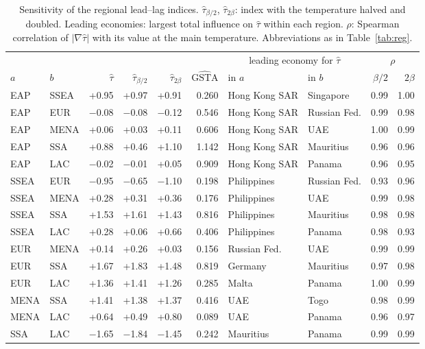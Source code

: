 \documentclass[12pt]{article}
\theoremstyle{definition}
\begin{document}
\begin{table}[hp]
\caption{Sensitivity of the regional lead--lag indices. $\hat\tau_{\beta/2}$, $\hat\tau_{2\beta}$: index with the temperature halved and doubled. Leading economies: largest total influence on $\hat\tau$ within each region. $\rho$: Spearman correlation of $|\nabla\hat\tau|$ with its value at the main temperature. Abbreviations as in Table~\ref{tab:reg}.}\label{tab:regsens}
\centering\scriptsize
\begin{tabular}{llrrrrllrr}
\toprule
 & & & & & & \multicolumn{2}{c}{leading economy for $\hat\tau$} & \multicolumn{2}{c}{$\rho$}\\
\cmidrule(lr){7-8}\cmidrule(lr){9-10}
$a$ & $b$ & $\hat\tau$ & $\hat\tau_{\beta/2}$ & $\hat\tau_{2\beta}$ & $\widehat{\mathrm{GSTA}}$ & in $a$ & in $b$ & $\beta/2$ & $2\beta$\\
\midrule
EAP & SSEA & +0.95 & +0.97 & +0.91 & 0.260 & Hong Kong SAR & Singapore & 0.99 & 1.00\\
EAP & EUR & $-$0.08 & $-$0.08 & $-$0.12 & 0.546 & Hong Kong SAR & Russian Fed. & 0.99 & 0.98\\
EAP & MENA & +0.06 & +0.03 & +0.11 & 0.606 & Hong Kong SAR & UAE & 1.00 & 0.99\\
EAP & SSA & +0.88 & +0.46 & +1.10 & 1.142 & Hong Kong SAR & Mauritius & 0.96 & 0.96\\
EAP & LAC & $-$0.02 & $-$0.01 & +0.05 & 0.909 & Hong Kong SAR & Panama & 0.96 & 0.95\\
SSEA & EUR & $-$0.95 & $-$0.65 & $-$1.10 & 0.198 & Philippines & Russian Fed. & 0.93 & 0.96\\
SSEA & MENA & +0.28 & +0.31 & +0.36 & 0.176 & Philippines & UAE & 0.99 & 0.98\\
SSEA & SSA & +1.53 & +1.61 & +1.43 & 0.816 & Philippines & Mauritius & 0.98 & 0.98\\
SSEA & LAC & +0.28 & +0.06 & +0.66 & 0.406 & Philippines & Panama & 0.98 & 0.93\\
EUR & MENA & +0.14 & +0.26 & +0.03 & 0.156 & Russian Fed. & UAE & 0.99 & 0.99\\
EUR & SSA & +1.67 & +1.83 & +1.48 & 0.819 & Germany & Mauritius & 0.97 & 0.98\\
EUR & LAC & +1.36 & +1.41 & +1.26 & 0.285 & Malta & Panama & 1.00 & 0.99\\
MENA & SSA & +1.41 & +1.38 & +1.37 & 0.416 & UAE & Togo & 0.98 & 0.99\\
MENA & LAC & +0.64 & +0.49 & +0.80 & 0.089 & UAE & Panama & 0.96 & 0.97\\
SSA & LAC & $-$1.65 & $-$1.84 & $-$1.45 & 0.242 & Mauritius & Panama & 0.99 & 0.99\\
\bottomrule
\end{tabular}
\end{table}
\end{document}
